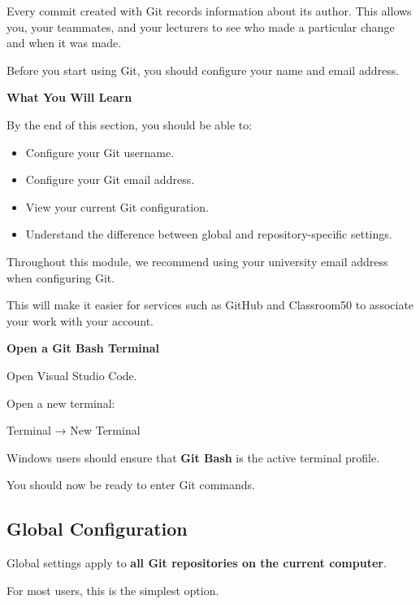 \documentclass{csc2059practical}
\begin{document}
Every commit created with Git records information about its author. This allows you, your teammates, and your lecturers to see who made a particular change and when it was made.

Before you start using Git, you should configure your name and email address.

\begin{learningoutcomes}
\textbf{What You Will Learn}\par
\medskip
By the end of this section, you should be able to:

\begin{itemize}
  \item Configure your Git username.
  \item Configure your Git email address.
  \item View your current Git configuration.
  \item Understand the difference between global and repository-specific settings.
\end{itemize}
\end{learningoutcomes}
\begin{importantnote}

Throughout this module, we recommend using your university email address when configuring Git.


This will make it easier for services such as GitHub and Classroom50 to associate your work with your account.


\end{importantnote}
\begin{commonerror}
\textbf{Open a Git Bash Terminal}\par
\medskip

Open Visual Studio Code.


Open a new terminal:


Terminal → New Terminal


Windows users should ensure that \textbf{Git Bash} is the active terminal profile.


You should now be ready to enter Git commands.


\end{commonerror}
\subsection{Global Configuration}
Global settings apply to \textbf{all Git repositories on the current computer}.

For most users, this is the simplest option.
\end{document}
